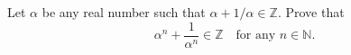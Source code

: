 Let $\alpha$ be any real number such that $\alpha + 1/\alpha \in \mathbb{Z}$. Prove that
\[ \alpha^n + \frac{1}{\alpha^n} \in \mathbb{Z} \quad\text{for any } n \in \mathbb{N}. \]
